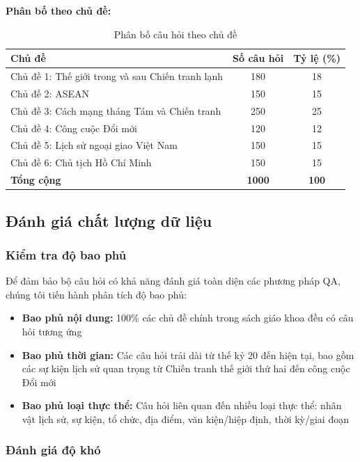 \textbf{Phân bố theo chủ đề:}

\begin{table}[H]
\centering
\caption{Phân bố câu hỏi theo chủ đề}
\label{tab:question-topic-dist}
\begin{tabular}{|l|c|c|}
\hline
\textbf{Chủ đề} & \textbf{Số câu hỏi} & \textbf{Tỷ lệ (\%)} \\
\hline
Chủ đề 1: Thế giới trong và sau Chiến tranh lạnh & 180 & 18 \\
Chủ đề 2: ASEAN & 150 & 15 \\
Chủ đề 3: Cách mạng tháng Tám và Chiến tranh & 250 & 25 \\
Chủ đề 4: Công cuộc Đổi mới & 120 & 12 \\
Chủ đề 5: Lịch sử ngoại giao Việt Nam & 150 & 15 \\
Chủ đề 6: Chủ tịch Hồ Chí Minh & 150 & 15 \\
\hline
\textbf{Tổng cộng} & \textbf{1000} & \textbf{100} \\
\hline
\end{tabular}
\end{table}

\subsection{Đánh giá chất lượng dữ liệu}

\subsubsection{Kiểm tra độ bao phủ}

Để đảm bảo bộ câu hỏi có khả năng đánh giá toàn diện các phương pháp QA, chúng tôi tiến hành phân tích độ bao phủ:

\begin{itemize}
    \item \textbf{Bao phủ nội dung:} 100\% các chủ đề chính trong sách giáo khoa đều có câu hỏi tương ứng
    \item \textbf{Bao phủ thời gian:} Các câu hỏi trải dài từ thế kỷ 20 đến hiện tại, bao gồm các sự kiện lịch sử quan trọng từ Chiến tranh thế giới thứ hai đến công cuộc Đổi mới
    \item \textbf{Bao phủ loại thực thể:} Câu hỏi liên quan đến nhiều loại thực thể: nhân vật lịch sử, sự kiện, tổ chức, địa điểm, văn kiện/hiệp định, thời kỳ/giai đoạn
\end{itemize}

\subsubsection{Đánh giá độ khó}

